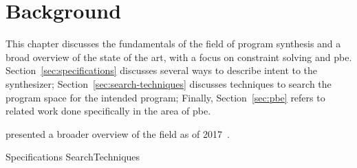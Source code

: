 \chapter{Background}
\label{chapter:background}

This chapter discusses the fundamentals of the field of program synthesis and a
broad overview of the state of the art, with a focus on constraint solving and
\gls{pbe}.
Section~\ref{sec:specifications} discusses several ways to describe intent to
the synthesizer; %
Section~\ref{sec:search-techniques} discusses techniques to search the program
space for the intended program; %
Finally, Section~\ref{sec:pbe} refers to related work done specifically in the
area of \gls{pbe}.

\citeauthor{Gulwani2017} presented a broader overview of the field as of
2017~\cite{Gulwani2017}.

{Specifications}
{SearchTechniques}
